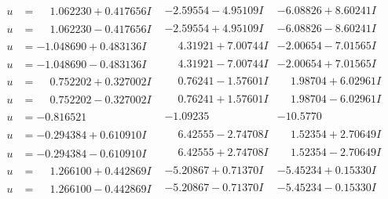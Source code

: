 \documentclass[1p]{elsarticle_modified}
\theoremstyle{definition}
\begin{document}
$$\begin{array}{c|c|c}
\begin{aligned}
u &= \phantom{-}1.062230 + 0.417656 I\end{aligned}
 & -2.59554 - 4.95109 I & -6.08826 + 8.60241 I \\ \hline\begin{aligned}
u &= \phantom{-}1.062230 - 0.417656 I\end{aligned}
 & -2.59554 + 4.95109 I & -6.08826 - 8.60241 I \\ \hline\begin{aligned}
u &= -1.048690 + 0.483136 I\end{aligned}
 & \phantom{-}4.31921 + 7.00744 I & -2.00654 - 7.01565 I \\ \hline\begin{aligned}
u &= -1.048690 - 0.483136 I\end{aligned}
 & \phantom{-}4.31921 - 7.00744 I & -2.00654 + 7.01565 I \\ \hline\begin{aligned}
u &= \phantom{-}0.752202 + 0.327002 I\end{aligned}
 & \phantom{-}0.76241 - 1.57601 I & \phantom{-}1.98704 + 6.02961 I \\ \hline\begin{aligned}
u &= \phantom{-}0.752202 - 0.327002 I\end{aligned}
 & \phantom{-}0.76241 + 1.57601 I & \phantom{-}1.98704 - 6.02961 I \\ \hline\begin{aligned}
u &= -0.816521\phantom{ +0.000000I}\end{aligned}
 & -1.09235\phantom{ +0.000000I} & -10.5770\phantom{ +0.000000I} \\ \hline\begin{aligned}
u &= -0.294384 + 0.610910 I\end{aligned}
 & \phantom{-}6.42555 - 2.74708 I & \phantom{-}1.52354 + 2.70649 I \\ \hline\begin{aligned}
u &= -0.294384 - 0.610910 I\end{aligned}
 & \phantom{-}6.42555 + 2.74708 I & \phantom{-}1.52354 - 2.70649 I \\ \hline\begin{aligned}
u &= \phantom{-}1.266100 + 0.442869 I\end{aligned}
 & -5.20867 + 0.71370 I & -5.45234 + 0.15330 I \\ \hline\begin{aligned}
u &= \phantom{-}1.266100 - 0.442869 I\end{aligned}
 & -5.20867 - 0.71370 I & -5.45234 - 0.15330 I \\ \hline\begin{aligned}

\end{aligned}
\end{array}$$
\end{document}
